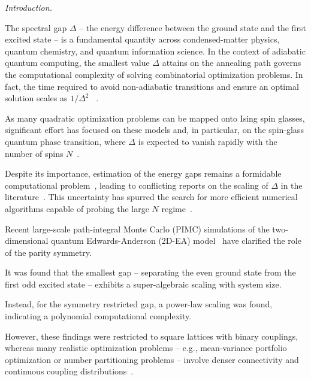 \documentclass[aps,prl,twocolumn,superscriptaddress,nofootinbib]{revtex4-2}
\begin{document}
\maketitle

\emph{Introduction.}

The spectral gap $\Delta$ -- the energy difference between the ground state and the first excited state -- is a fundamental quantity across condensed-matter physics, quantum chemistry, and quantum information science. In the context of adiabatic quantum computing, the smallest value $\Delta$ attains on the annealing path governs the computational complexity of solving combinatorial optimization problems. In fact, the time required to avoid non-adiabatic transitions and ensure an optimal solution scales as $1/\Delta^2$ ~\cite{RevModPhys.90.015002}.

As many quadratic optimization problems can be mapped onto Ising spin glasses, significant effort has focused on these models and, in particular, on the spin-glass quantum phase transition, where $\Delta$ is expected to vanish rapidly with the number of spins $N$~\cite{Kazutaka2010,BAPST2013127,PRXQuantum.5.020313,PhysRevLett.101.170503,tang2025stretchedexponentialscalingparityrestricted}.

Despite its importance, estimation of the energy gaps remains a formidable computational problem~\cite{6875473,10.1561/0400000066,Gharibian2019complexityof}, leading to conflicting reports on the scaling of $\Delta$ in the literature~\cite{PhysRevLett.72.4141,PhysRevLett.72.4137,PhysRevE.96.022139,PhysRevE.87.032154,PhysRevB.94.024201}.
This uncertainty has spurred the search for more efficient numerical algorithms capable of probing the large $N$ regime~\cite{PhysRevE.85.036705,PhysRevLett.121.167204,PhysRevResearch.6.033322,doi:10.1126/sciadv.abl6850}.

Recent large-scale path-integral Monte Carlo (PIMC) simulations of the two-dimensional quantum Edwards-Anderson (2D-EA) model~\cite{Bernaschi2024} have clarified the role of the parity symmetry.

It was found that the smallest gap -- separating the even ground state from the first odd excited state -- exhibits a super-algebraic scaling with system size.

Instead, for the symmetry restricted gap, a power-law scaling was found, indicating a polynomial computational complexity.

However, these findings were restricted to square lattices with binary couplings, whereas many realistic optimization problems -- e.g., mean-variance portfolio optimization or number partitioning problems -- involve denser connectivity and continuous coupling distributions~\cite{10.3389fphy.2014.00005,Venturelli2019}.
\end{document}
